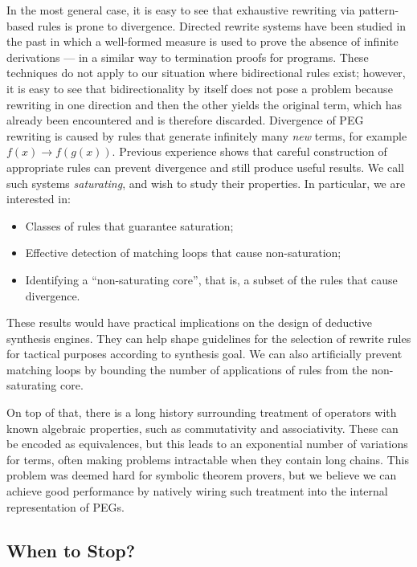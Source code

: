 In the most general case, it is easy to see that exhaustive rewriting via
pattern-based rules is prone to divergence.
Directed rewrite systems have been studied in the past in which a well-formed
measure is used to prove the absence of infinite derivations --- in a similar
way to termination proofs for programs.
These techniques do not apply to our situation where bidirectional rules exist;
however, it is easy to see that bidirectionality by itself does not pose a
problem because rewriting in one direction and then the other yields the
original term, which has already been encountered and is therefore discarded.
Divergence of PEG rewriting is caused by rules that generate infinitely many
\emph{new} terms, for example $f(x) \to f(g(x))$.
Previous experience shows that careful construction of appropriate rules can
prevent divergence and still produce useful results\cite{lpar2010}.
We call such systems \emph{saturating}, and wish to study their properties.
In particular, we are interested in:
\begin{itemize}
  \item Classes of rules that guarantee saturation;
  \item Effective detection of matching loops that cause non-saturation;
  \item Identifying a ``non-saturating core'', that is, a subset of the
    rules that cause divergence. 
\end{itemize}

These results would have practical implications on the design of
deductive synthesis engines.
They can help shape guidelines for the selection of rewrite rules for
tactical purposes according to synthesis goal.
We can also artificially prevent matching loops by bounding the number of
applications of rules from the non-saturating core.

On top of that, there is a long history surrounding treatment of
operators with known algebraic properties, such as commutativity
and associativity.
These can be encoded as equivalences, but this leads to an exponential
number of variations for terms, often making problems intractable when
they contain long chains.
This problem was deemed hard for symbolic theorem provers, but we
believe we can achieve good performance by natively wiring such treatment
into the internal representation of PEGs.

\subsection{When to Stop?}

